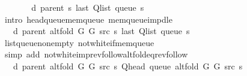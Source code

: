 \begin{isabellebody}
\ \ \isamarkupfalse%
\ \isamarkupfalse%
\ {\isachardoublequoteopen}{\isachardot}{\kern0pt}{\isachardot}{\kern0pt}{\isachardot}{\kern0pt}\ {\isasymle}\ d\ {\isacharparenleft}{\kern0pt}parent\ s{\isacharparenright}{\kern0pt}\ {\isacharparenleft}{\kern0pt}last\ {\isacharparenleft}{\kern0pt}Q{\isacharunderscore}{\kern0pt}list\ {\isacharparenleft}{\kern0pt}queue\ s{\isacharparenright}{\kern0pt}{\isacharparenright}{\kern0pt}{\isacharparenright}{\kern0pt}{\isachardoublequoteclose}\isanewline
\ \ \ \ \isamarkupfalse%
\ {\isacharparenleft}{\kern0pt}intro\ head{\isacharunderscore}{\kern0pt}queue{\isacharunderscore}{\kern0pt}mem{\isacharunderscore}{\kern0pt}queue\ mem{\isacharunderscore}{\kern0pt}queue{\isacharunderscore}{\kern0pt}imp{\isacharunderscore}{\kern0pt}d{\isacharunderscore}{\kern0pt}le{\isacharparenright}{\kern0pt}\isanewline
\ \ \isamarkupfalse%
\ \isamarkupfalse%
\ {\isachardoublequoteopen}{\isachardot}{\kern0pt}{\isachardot}{\kern0pt}{\isachardot}{\kern0pt}\ {\isacharequal}{\kern0pt}\ d\ {\isacharparenleft}{\kern0pt}parent\ {\isacharparenleft}{\kern0pt}alt{\isacharunderscore}{\kern0pt}fold\ G{}\ G{}\ src\ s{\isacharparenright}{\kern0pt}{\isacharparenright}{\kern0pt}\ {\isacharparenleft}{\kern0pt}last\ {\isacharparenleft}{\kern0pt}Q{\isacharunderscore}{\kern0pt}list\ {\isacharparenleft}{\kern0pt}queue\ s{\isacharparenright}{\kern0pt}{\isacharparenright}{\kern0pt}{\isacharparenright}{\kern0pt}{\isachardoublequoteclose}\isanewline
\ \ \ \ \isamarkupfalse%
\ list{\isacharunderscore}{\kern0pt}queue{\isacharunderscore}{\kern0pt}non{\isacharunderscore}{\kern0pt}empty\ not{\isacharunderscore}{\kern0pt}white{\isacharunderscore}{\kern0pt}if{\isacharunderscore}{\kern0pt}mem{\isacharunderscore}{\kern0pt}queue\isanewline
\ \ \ \ \isamarkupfalse%
\ {\isacharparenleft}{\kern0pt}simp\ add{\isacharcolon}{\kern0pt}\ not{\isacharunderscore}{\kern0pt}white{\isacharunderscore}{\kern0pt}imp{\isacharunderscore}{\kern0pt}rev{\isacharunderscore}{\kern0pt}follow{\isacharunderscore}{\kern0pt}alt{\isacharunderscore}{\kern0pt}fold{\isacharunderscore}{\kern0pt}eq{\isacharunderscore}{\kern0pt}rev{\isacharunderscore}{\kern0pt}follow{\isacharparenright}{\kern0pt}\isanewline
\ \ \isamarkupfalse%
\ \isamarkupfalse%
\ {\isachardoublequoteopen}{\isachardot}{\kern0pt}{\isachardot}{\kern0pt}{\isachardot}{\kern0pt}\ {\isasymle}\ d\ {\isacharparenleft}{\kern0pt}parent\ {\isacharparenleft}{\kern0pt}alt{\isacharunderscore}{\kern0pt}fold\ G{}\ G{}\ src\ s{\isacharparenright}{\kern0pt}{\isacharparenright}{\kern0pt}\ {\isacharparenleft}{\kern0pt}Q{\isacharunderscore}{\kern0pt}head\ {\isacharparenleft}{\kern0pt}queue\ {\isacharparenleft}{\kern0pt}alt{\isacharunderscore}{\kern0pt}fold\ G{}\ G{}\ src\ s{\isacharparenright}{\kern0pt}{\isacharparenright}{\kern0pt}{\isacharparenright}{\kern0pt}{\isachardoublequoteclose}\isanewline

\end{isabellebody}
